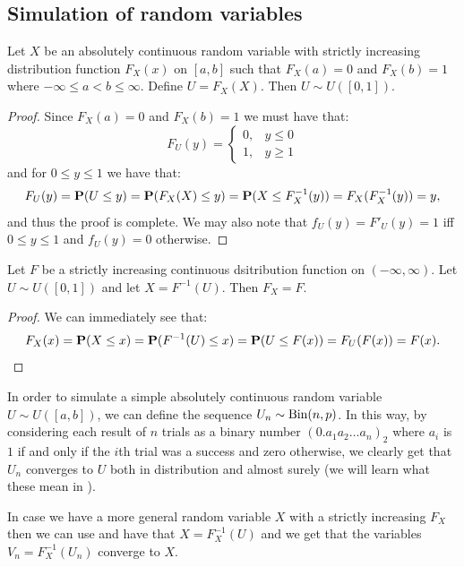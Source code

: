 \documentclass[11pt,a4paper]{article}
\begin{document}
\subsection{Simulation of random variables}

\begin{proposition}
  \label{prop:sim-one}
  Let $X$ be an absolutely continuous random variable with strictly increasing
  distribution function $F_X(x)$ on $[a,b]$ such that $F_X(a) = 0$
  and $F_X(b) = 1$ where $-\infty \le a < b \le \infty$.
  Define $U = F_X(X)$.
  Then $U \sim U([0,1])$.
\end{proposition}
\begin{proof}
  Since $F_X(a) = 0$ and $F_X(b) = 1$ we must have that:
  \[
    F_U(y) =
    \begin{cases}
      0, &y \le 0 \\
      1, &y \geq 1
    \end{cases}
  \]
  and for $0 \le y \le 1$ we have that:
  \[
    F_U(y) =
    \mathbf{P}(U \le y) =
    \mathbf{P}(F_X(X) \le y) =
    \mathbf{P}(X \le F_X^{-1}(y)) =
    F_X(F_X^{-1}(y)) = y,
  \]
  and thus the proof is complete.
  We may also note that $f_U(y) = F'_U(y) = 1$ iff $0 \le y \le 1$
  and $f_U(y) = 0$ otherwise.
\end{proof}

\begin{proposition}
  \label{prop:sim-two}
  Let $F$ be a strictly increasing continuous dsitribution function
  on $(-\infty,\infty)$.
  Let $U \sim U([0,1])$ and let $X = F^{-1}(U)$.
  Then $F_X = F$.
\end{proposition}
\begin{proof}
  We can immediately see that:
  \[
    F_X(x) =
    \mathbf{P}(X \le x) =
    \mathbf{P}(F^{-1}(U) \le x) =
    \mathbf{P}(U \le F(x)) =
    F_U(F(x)) = F(x).
  \]
\end{proof}

\begin{example}
  In order to simulate a simple absolutely continuous random variable
  $U \sim U([a,b])$, we can define the sequence $U_n \sim \operatorname{Bin}(n,p)$.
  In this way, by considering each result of $n$ trials
  as a binary number $(0.a_1a_2\dots a_n)_2$ where $a_i$
  is $1$ if and only if the $i$th trial was a success and zero otherwise,
  we clearly get that $U_n$ converges to $U$ both in distribution
  and almost surely
  (we will learn what these mean in ).

  In case we have a more general random variable $X$ with a strictly
  increasing $F_X$ then we can use 
  and have that $X = F_X^{-1}(U)$ and we get that
  the variables $V_n = F_X^{-1}(U_n)$ converge to $X$.
\end{example}
\end{document}
